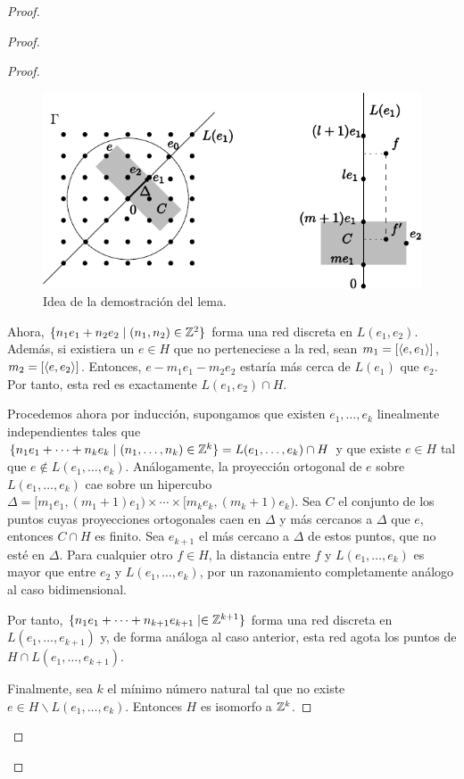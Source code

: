 \begin{proof}
\begin{proof}
\begin{proof}
  \begin{figure}[h]
    \centering
    \includegraphics{pics/grupo}
    \caption{Idea de la demostración del lema.}
    \label{fig:grupo}
  \end{figure}

      Ahora, $\{n_1e_1+n_2e_2 \mid (n_1,n_2) \in \mathbb{Z}^2 \}$ forma una red discreta en $L(e_1,e_2)$. Además, si existiera un $e\in H$ que no perteneciese a la red, sean $m_1=[\left\langle e,e_1\right\rangle]$, $m_2=[\left\langle e,e_2\right\rangle]$. Entonces, $e-m_1e_1-m_2e_2$ estaría más cerca de $L(e_1)$ que $e_2$. Por tanto, esta red es exactamente $L(e_1,e_2) \cap H$.

      Procedemos ahora por inducción, supongamos que existen $e_1,\dots,e_k$ linealmente independientes tales que $\{n_1e_1+\cdots+n_ke_k \mid (n_1,\dots,n_k) \in \mathbb{Z}^k \} = L(e_1,\dots,e_k) \cap H$ y que existe $e\in H$ tal que $e \not\in L(e_1,\dots,e_k)$. Análogamente, la proyección ortogonal de $e$ sobre $L(e_1,\dots,e_k)$ cae sobre un hipercubo $\Delta=[m_1e_1,(m_1+1)e_1) \times \cdots \times [m_ke_k,(m_k+1)e_k)$. Sea $C$ el conjunto de los puntos cuyas proyecciones ortogonales caen en $\Delta$ y más cercanos a $\Delta$ que $e$, entonces $C \cap H$ es finito. Sea $e_{k+1}$ el más cercano a $\Delta$ de estos puntos, que no esté en $\Delta$. Para cualquier otro $f \in H$, la distancia entre $f$ y $L(e_1,\dots,e_k)$ es mayor que entre $e_2$ y $L(e_1,\dots,e_k)$, por un razonamiento completamente análogo al caso bidimensional. 

	Por tanto, $\{n_1e_1+\dots+n_{k+1}e_{k+1} \mid \in \mathbb{Z}^{k+1}\}$ forma una red discreta en $L(e_1,\dots,e_{k+1})$ y, de forma análoga al caso anterior, esta red agota los puntos de $H\cap L(e_1,\dots,e_{k+1})$.

	Finalmente, sea $k$ el mínimo número natural tal que no existe $e \in H \backslash L(e_1,\dots,e_k)$. Entonces $H$ es isomorfo a $\mathbb{Z}^k$.
\end{proof}


\end{proof}
\end{proof}
